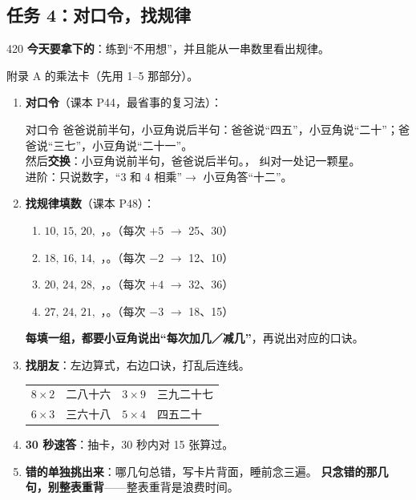 \subsection{任务 4：对口令，找规律}

\begin{lesson}{4}{20}
\textbf{今天要拿下的}：练到“不用想”，并且能从一串数里看出规律。

\begin{materials}
附录 A 的乘法卡（先用 1--5 那部分）。
\end{materials}

\begin{enumerate}
  \item \textbf{对口令}（课本 P44，最省事的复习法）：
        \begin{playbox}{对口令}
        爸爸说前半句，小豆角说后半句：爸爸说“四五”，小豆角说“二十”；爸爸说“三七”，小豆角说“二十一”。\\
        然后\textbf{交换}：小豆角说前半句，爸爸说后半句。，
        纠对一处记一颗星。\\
        进阶：只说数字，“3 和 4 相乘”$\to$ 小豆角答“十二”。
        \end{playbox}
  \item \textbf{找规律填数}（课本 P48）：
        \begin{enumerate}[label=（\arabic*）,itemsep=3pt]
          \item $10,\,15,\,20,$ \blank[1.4cm]，\blank[1.4cm]。（每次 $+5$ $\to$ 25、30）
          \item $18,\,16,\,14,$ \blank[1.4cm]，\blank[1.4cm]。（每次 $-2$ $\to$ 12、10）
          \item $20,\,24,\,28,$ \blank[1.4cm]，\blank[1.4cm]。（每次 $+4$ $\to$ 32、36）
          \item $27,\,24,\,21,$ \blank[1.4cm]，\blank[1.4cm]。（每次 $-3$ $\to$ 18、15）
        \end{enumerate}
        \textbf{每填一组，都要小豆角说出“每次加几／减几”}，再说出对应的口诀。
  \item \textbf{找朋友}：左边算式，右边口诀，打乱后连线。
        \begin{center}
        \small
        \begin{tabular}{@{}llll@{}}
        $8\times2$ & 二八十六 & $3\times9$ & 三九二十七 \\
        $6\times3$ & 三六十八 & $5\times4$ & 四五二十 \\
        \end{tabular}
        \end{center}
  \item \textbf{30 秒速答}：抽卡，30 秒内对 15 张算过。
  \item \textbf{错的单独挑出来}：哪几句总错，写卡片背面，睡前念三遍。
        \textbf{只念错的那几句，别整表重背}——整表重背是浪费时间。
\end{enumerate}


\end{lesson}
